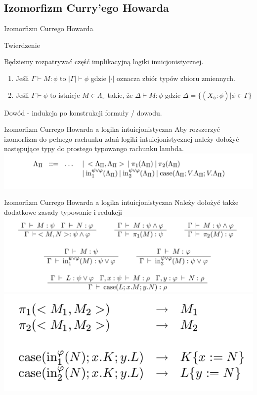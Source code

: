 \documentclass{beamer}
\begin{document}
\subsection{Izomorfizm Curry'ego Howarda}
\begin{frame}{Izomorfizm Currego Howarda}
\begin{block}{Twierdzenie}

Będziemy rozpatrywać część implikacyjną logiki inuicjonistycznej. 
\begin{enumerate}
	\item Jeśli \( \Gamma \vdash M : \phi \) to \( | \Gamma | \vdash \phi \) gdzie \(|\cdot|\) oznacza zbiór typów zbioru zmiennych.
	\item Jeśli \( \Gamma \vdash \phi \) to istnieje \( M \in \Lambda_{\pi}\) takie, że \( \Delta \vdash M : \phi \) gdzie \( \Delta = \{ (X_{\phi} : \phi) | \phi \in \Gamma \} \)
\end{enumerate}
Dowód - indukcja po konstrukcji formuły / dowodu.
\end{block}
\end{frame}

\begin{frame}{Izomorfizm Currego Howarda a logika intuicjonistyczna}
Aby rozszerzyć izomorfizm do pełnego rachunku zdań logiki intuicjonistycznej należy dołożyć następujące typy do prostego typowango rachunku lambda.
\includegraphics[scale=0.25]{types_curry.png}
\end{frame}

\begin{frame}{Izomorfizm Currego Howarda a logika intuicjonistyczna}
Należy dołożyć także dodatkowe zasady typowanie i redukcji
\includegraphics[scale=0.25]{int_curry.png}\\
\includegraphics[scale=0.25]{red_curry.png}
\end{frame}
\end{document}
